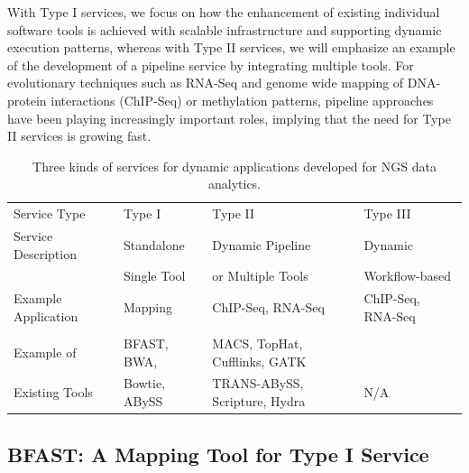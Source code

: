 \documentclass{cpeauth}
\begin{document}
With Type I services, we focus on how the enhancement of existing
individual software tools is achieved with scalable infrastructure and
supporting dynamic execution patterns, whereas with Type II services,
we will emphasize an example of the development of a pipeline service
by integrating multiple tools. For evolutionary techniques such as
RNA-Seq and genome wide mapping of DNA-protein interactions (ChIP-Seq)
or methylation patterns, pipeline approaches have been playing
increasingly important roles, implying that the need for Type II
services is growing fast.


\begin{table}[!h]
\begin{center}
 \caption{Three kinds of services for dynamic applications developed for NGS data analytics. %
 }
 \begin{tabular}{| l | l | l | l |} \hline \rowcolor[rgb]{0.8,0.8,0.8}
   Service Type &
   Type I & Type II & Type III \\ 

   Service Description & Standalone  & Dynamic Pipeline & Dynamic \\
               & Single Tool & or Multiple Tools & Workflow-based \\\hline
 Example Application & Mapping & ChIP-Seq, RNA-Seq & ChIP-Seq, RNA-Seq \\ 
  & & & \\ \hline 

  Example of & BFAST, BWA, & MACS, TopHat, Cufflinks, GATK& 
   \\
  Existing Tools &  Bowtie, ABySS  & TRANS-ABySS, Scripture, Hydra  & N/A \\
   \hline
\end{tabular}
\label{table:three-type-service}
\end{center}
\end{table}


\subsection{BFAST: A Mapping Tool for Type I Service}
\end{document}
